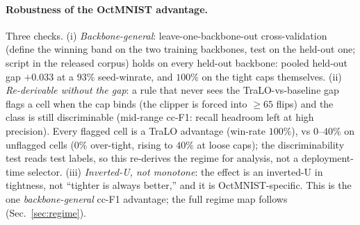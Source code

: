 \documentclass[10pt]{article}
\begin{document}
\paragraph{Robustness of the OctMNIST advantage.}
Three checks. (i) \emph{Backbone-general}: leave-one-backbone-out
cross-validation (define the winning band on the two training backbones,
test on the held-out one; script in the released corpus) holds on every
held-out backbone: pooled held-out gap $+0.033$ at a $93\%$ seed-winrate,
and $100\%$ on the tight caps themselves. (ii) \emph{Re-derivable without
the gap}: a rule that never sees the TraLO-vs-baseline gap flags a cell
when the cap binds (the clipper is forced into $\ge 65$ flips) and the
class is still discriminable (mid-range cc-F1: recall headroom left at
high precision). Every flagged cell is a TraLO advantage
(win-rate $100\%$), vs $0$--$40\%$ on unflagged cells ($0\%$ over-tight,
rising to $40\%$ at loose caps); the discriminability test reads test
labels, so this re-derives the regime for analysis, not a deployment-time
selector. (iii) \emph{Inverted-U, not monotone}: the effect is an
inverted-U in tightness, not ``tighter is always better,'' and it is
OctMNIST-specific. This is the one \emph{backbone-general} cc-F1
advantage; the full regime map follows (Sec.~\ref{sec:regime}).
\end{document}
